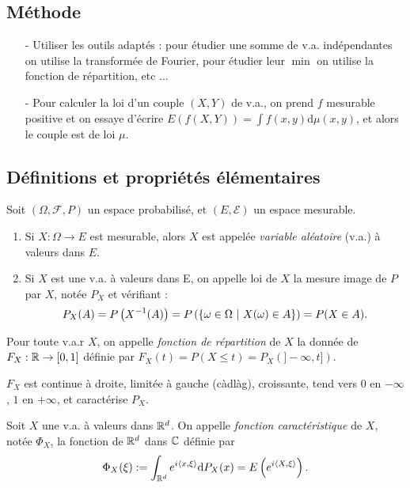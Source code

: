 \documentclass[11pt,a4paper]{article}
\begin{document}
\subsection*{Méthode}
\begin{itemize}
\item[-] Utiliser les outils adaptés : pour étudier une somme de v.a. indépendantes on utilise la transformée de Fourier, pour étudier leur $\min$ on utilise la fonction de répartition, etc $\dots$
\item[-] Pour calculer la loi d'un couple $(X,Y)$ de v.a., on prend $f$ mesurable positive et on essaye d'écrire $\displaystyle E\left(f(X,Y)\right) = \int f(x,y) \mathrm{d}\mu(x,y)$, et alors le couple est de loi $\mu$.
\end{itemize}

\subsection*{Définitions et propriétés élémentaires}

\begin{definstar} Soit  $(\Omega, \mathcal{F}, P)$ un espace probabilisé, et $(E,\mathcal{E})$ un espace mesurable.
\begin{enumerate}
\item Si $X: \Omega \to E$ est mesurable, alors $X$ est appelée \textit{variable aléatoire} (v.a.) à valeurs dans $E$.
\item Si $X$ est une v.a. à valeurs dans E, on appelle loi de $X$ la mesure image de $P$ par $X$, notée $P_X$ et vérifiant : 
\[P_X(A) = P\left(X^{-1}(A)\right)=P\left(\left\{ \omega\in \Omega \ \middle| \  X(\omega)\in A \right\}\right) =P(X\in A).\]
\end{enumerate}
\end{definstar}

\begin{definstar}
Pour toute v.a.r $X$, on appelle \textit{fonction de répartition} de $X$ la donnée de $F_X :\mathbb R \to [0,1]$ définie par $F_X(t) = P(X\leq t) = P_X(]-\infty,t])$.
\end{definstar}

\begin{rmq}
$F_X$ est continue à droite, limitée à gauche (càdlàg), croissante, tend vers $0$ en $-\infty$, $1$ en $+\infty$, et caractérise $P_X$.
\end{rmq}

\begin{definstar}
Soit $X$ une v.a. à valeurs dans $\mathbb R^d$. On appelle \textit{fonction caractéristique} de $X$, notée $\Phi_X$, la fonction de $\mathbb R^d$ dans $\mathbb C$ définie par \[\Phi_X(\xi) := \int_{\mathbb R^d} e^{i\left<x,\xi\right>}\mathrm{d}P_X(x) = E\left(e^{i\left<X,\xi\right>}\right).\]
\end{definstar}
\end{document}
